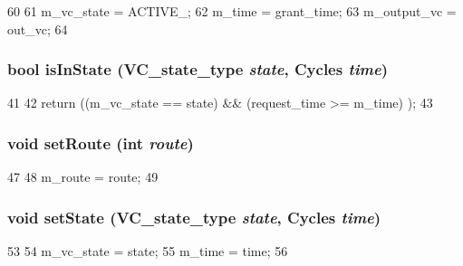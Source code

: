 \begin{DoxyCode}
60 {
61     m_vc_state = ACTIVE_;
62     m_time = grant_time;
63     m_output_vc = out_vc;
64 }
\end{DoxyCode}
\hypertarget{classInVcState_a798660c27b9ee51b885d15feac2a482c}{
\subsubsection[{isInState}]{\setlength{\rightskip}{0pt plus 5cm}bool isInState ({\bf VC\_\-state\_\-type} {\em state}, \/  {\bf Cycles} {\em time})}}
\label{classInVcState_a798660c27b9ee51b885d15feac2a482c}



\begin{DoxyCode}
41 {
42     return ((m_vc_state == state) && (request_time >= m_time) );
43 }
\end{DoxyCode}
\hypertarget{classInVcState_aacdd073cbcdcd8b22630bd91eff91612}{
\subsubsection[{setRoute}]{\setlength{\rightskip}{0pt plus 5cm}void setRoute (int {\em route})}}
\label{classInVcState_aacdd073cbcdcd8b22630bd91eff91612}



\begin{DoxyCode}
47 {
48     m_route = route;
49 }
\end{DoxyCode}
\hypertarget{classInVcState_a4ac4ce58e7eac1aee69c9891552538ec}{
\subsubsection[{setState}]{\setlength{\rightskip}{0pt plus 5cm}void setState ({\bf VC\_\-state\_\-type} {\em state}, \/  {\bf Cycles} {\em time})}}
\label{classInVcState_a4ac4ce58e7eac1aee69c9891552538ec}



\begin{DoxyCode}
53 {
54     m_vc_state = state;
55     m_time = time;
56 }
\end{DoxyCode}


